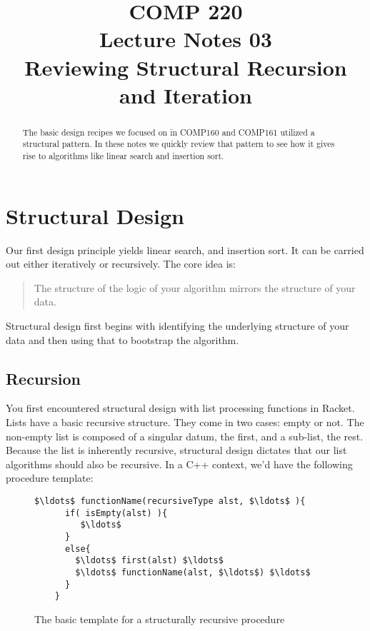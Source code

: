 \documentclass[nobib]{tufte-handout}
\title{COMP 220 \\ Lecture Notes 03 \\ Reviewing Structural Recursion and Iteration}
\begin{document}
\maketitle

\begin{abstract}
  The basic design recipes we focused on in COMP160 and COMP161 utilized a structural pattern. In these notes we quickly review that pattern to see how it gives rise to algorithms like linear search and insertion sort.
\end{abstract}

\section{Structural Design}

Our first design principle yields linear search, and insertion sort. It can be carried out either iteratively or recursively. The core idea is:

\begin{quote}
  The structure of the logic of your algorithm mirrors the structure of your data.
\end{quote}

Structural design first begins with identifying the underlying structure of your data and then using that to bootstrap the algorithm.

\subsection{Recursion}

You first encountered structural design with list processing functions in Racket. Lists have a basic recursive structure. They come in two cases: empty or not. The non-empty list is composed of a singular datum, the first, and a sub-list, the rest. Because the list is inherently recursive, structural design dictates that our list algorithms should also be recursive. In a C++ context, we'd have the following procedure template:

\begin{figure}
  \begin{lstlisting}[mathescape=true]
    $\ldots$ functionName(recursiveType alst, $\ldots$ ){
      if( isEmpty(alst) ){
         $\ldots$
      }
      else{
        $\ldots$ first(alst) $\ldots$
        $\ldots$ functionName(alst, $\ldots$) $\ldots$
      }
    }
  \end{lstlisting}
\label{structRec}
\caption{The basic template for a structurally recursive procedure}
\end{figure}
\end{document}
